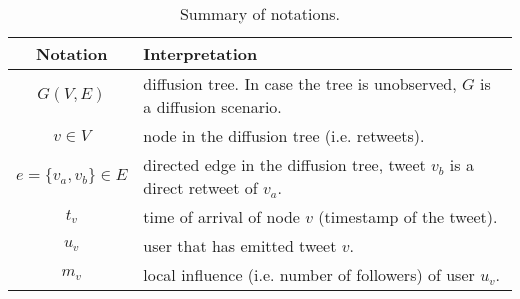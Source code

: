 
\begin{table}[!b]
\caption{Summary of notations.}
\small
\centering
\begin{tabular}{cp{5.5cm}}
\toprule
Notation & Interpretation \\ %
\midrule
	$G(V, E)$ & diffusion tree. In case the tree is unobserved, $G$ is a diffusion scenario. \\ 
	$v \in V$ & node in the diffusion tree (i.e. retweets). \\ 
	$e = \{v_a, v_b\} \in E$ & directed edge in the diffusion tree, tweet $v_b$ is a direct retweet of $v_a$.\\
	$t_v$ & time of arrival of node $v$ (timestamp of the tweet). \\
	$u_v$ & user that has emitted tweet $v$. \\
	$m_v$ & local influence (i.e. number of followers) of user $u_v$. \\
\bottomrule
\end{tabular}
\label{tab:parameters}
\end{table}